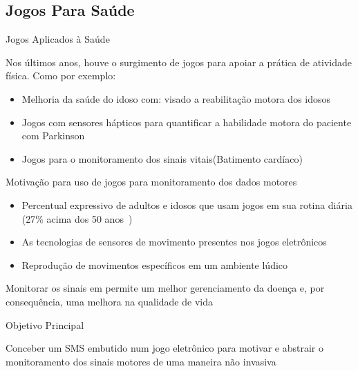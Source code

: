 \documentclass{beamer}
\begin{document}
\subsection{Jogos Para Saúde}
\begin{frame}{Jogos Aplicados à Saúde}
	\begin{block}{}	
	Nos últimos anos, houve o surgimento de jogos para apoiar a prática de atividade física. Como por exemplo:
	
	\begin{itemize}
	    \item Melhoria da saúde do idoso com: visado a reabilitação motora dos idosos~\cite{sacbespoke2014}
	    \item Jogos com sensores hápticos para quantificar a habilidade motora do paciente com Parkinson ~\cite{atkinson2010}
	    \item Jogos para o monitoramento dos sinais vitais(Batimento cardíaco)~\cite{Sinclair:2009:UVB:1515604.1515617}
	\end{itemize}
	\end{block}
\end{frame}


\begin{frame}{Motivação para uso de jogos para monitoramento dos dados motores}
	\begin{block}{}
	\begin{itemize}
	    \item Percentual expressivo de adultos e idosos que usam jogos em sua rotina diária (27\% acima dos 50 anos~\cite{esa2015})
	    \item As tecnologias de sensores de movimento presentes nos jogos eletrônicos
	    \item Reprodução de movimentos específicos em um ambiente lúdico
	\end{itemize}
	\end{block}
	
	\begin{alertblock}{}
	Monitorar os sinais em permite um melhor gerenciamento da doença e, por consequência, uma melhora na qualidade de vida
	\end{alertblock}
\end{frame}


\begin{frame}{Objetivo Principal}
  \begin{block}{}
  Conceber um SMS embutido num jogo eletrônico para motivar e abstrair o monitoramento dos sinais motores de uma maneira não invasiva
  \end{block}
\end{frame}
\end{document}
